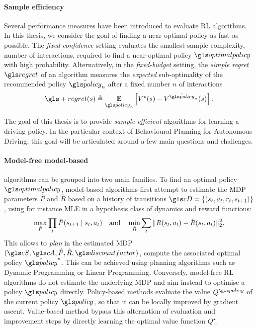 \paragraph{Sample efficiency}
Several performance measures have been introduced to evaluate \gls{RL} algorithms. In this thesis, we consider the goal of finding a near-optimal policy as fast as possible. The \emph{fixed-confidence} setting evaluates the smallest sample complexity, \ie number of interactions, required to find a near-optimal policy $\optimalpolicy$ with high probability. Alternatively, in the \emph{fixed-budget} setting, the \emph{simple regret} $\regret$ of an algorithm measures the \emph{expected} sub-optimality of the recommended policy $\hat{\policy}_n$ after a fixed number $n$ of interactions
\begin{equation*}
\gls+{regret}(s) \eqdef \expectedvalue_{\hat{\policy}_n} \left[ V^\star(s) - V^{\hat{\policy}_n}(s) \right].
\end{equation*}


The goal of this thesis is to provide \emph{sample-efficient} algorithms for learning a driving policy. In the particular context of Behavioural Planning for Autonomous Driving, this goal will be articulated around a few main questions and challenges.

\paragraph{Model-free \vs model-based}

 algorithms can be grouped into two main families. 
To find an optimal policy $\optimalpolicy$, model-based  algorithms first attempt to estimate the \gls{MDP} parameters $\hat{P}$ and $\hat{R}$ based on a history of transitions $\cD = \{(s_{t},a_t, r_t, s_{t+1})\}$, using for instance \gls{MLE} in a hypothesis class of dynamics and reward functions:
\begin{equation*}
\max_{\hat{P}} \prod_{t}\hat{P}\lparen s_{t+1} \mid s_t,a_t\rparen \quad \text{and} \quad \min_{\hat{R}} \sum_{t}\|R(s_t,a_t) - \hat{R}(s_t,a_t)\|^2_2.
\end{equation*}
This allows to \emph{plan} in the estimated \gls{MDP} $(\cS,\cA, \hat{P}, \hat{R}, \discount)$, \ie compute the associated optimal policy $\hat{\policy}^\star$. This can be achieved using planning algorithms such as Dynamic Programming or Linear Programming.
Conversely, model-free \gls{RL} algorithms do not estimate the underlying \gls{MDP} and aim instead to optimise a policy $\policy$ directly. Policy-based methods evaluate the value $Q^\policy$ of the current policy $\policy$, so that it can be locally improved \eg by gradient ascent. Value-based method bypass this alternation of evaluation and improvement steps by directly learning the optimal value function $Q^\star$.

